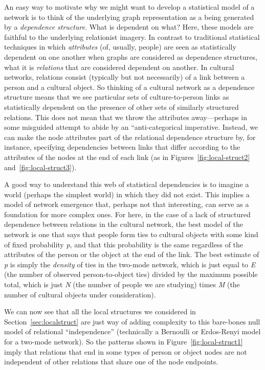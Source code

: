\documentclass[preprint,12pt,authoryear]{elsarticle}
\begin{document}
An easy way to motivate why we might want to develop a statistical model of a network is to think of the underlying graph representation as a being generated by a \textit{dependence structure}. What is dependent on what? Here, these models are faithful to the underlying relationist imagery. In contrast to traditional statistical techniques in which \textit{attributes} (of, usually, people) are seen as statistically dependent on one another when graphs are considered as dependence structures, what it is \textit{relations} that are considered dependent on another. In cultural networks, relations consist (typically but not necessarily) of a link between a person and a cultural object. So thinking of a cultural network as a dependence structure means that we see particular sets of culture-to-person links as statistically dependent on the presence of other sets of similarly structured relations. This does not mean that we throw the attributes away---perhaps in some misguided attempt to abide by an ``anti-categorical imperative. Instead, we can make the node attributes part of the relational dependence structure by, for instance, specifying dependencies between links that differ according to the attributes of the nodes at the end of each link (as in Figures~\ref{fig:local-struct2} and~\ref{fig:local-struct3}). 

A good way to understand this web of statistical dependencies is to imagine a world (perhaps the simplest world) in which they did not exist. This implies a model of network emergence that, perhaps not that interesting, can serve as a foundation for more complex ones. For here, in the case of a lack of structured dependence between relations in the cultural network, the best model of the network is one that says that people form ties to cultural objects with some kind of fixed probability \textit{p}, and that this probability is the same regardless of the attributes of the person or the object at the end of the link. The best estimate of \textit{p} is simply the \textit{density} of ties in the two-mode network, which is just equal to \textit{E} (the number of observed person-to-object ties) divided by the maximum possible total, which is just \textit{N} (the number of people we are studying) times \textit{M} (the number of cultural objects under consideration).

We can now see that all the local structures we considered in Section~\ref{sec:localstruct} are just way of adding complexity to this bare-bones null model of relational ``independence'' (technically a Bernoulli or Erdos-Renyi model for a two-mode network). So the patterns shown in Figure~\ref{fig:local-struct1} imply that relations that end in some types of person or object nodes are not independent of other relations that share one of the node endpoints. 
\end{document}
